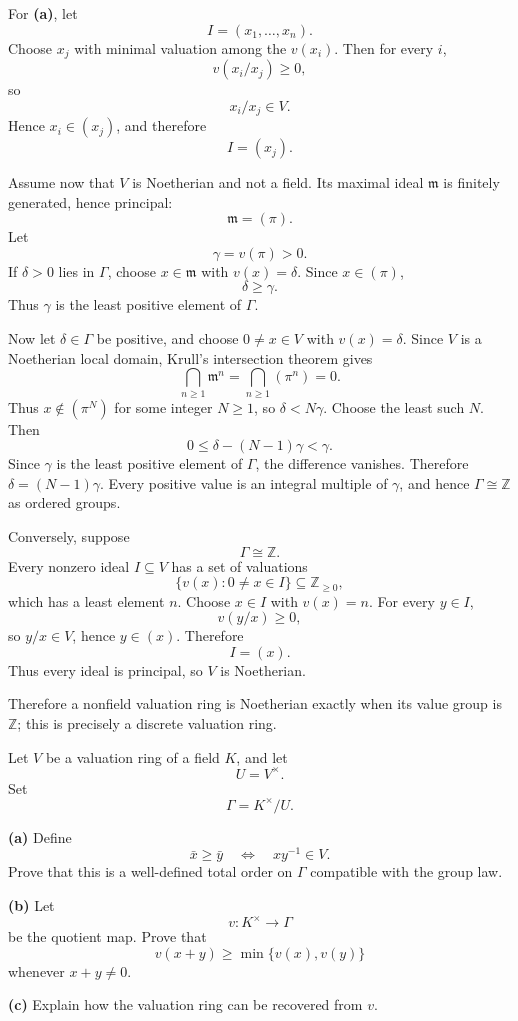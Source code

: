 \begin{solution}
For \textbf{(a)}, let
\[
I=(x_1,\dots,x_n).
\]
Choose \(x_j\) with minimal valuation among the \(v(x_i)\). Then for every
\(i\),
\[
v(x_i/x_j)\ge0,
\]
so
\[
x_i/x_j\in V.
\]
Hence \(x_i\in(x_j)\), and therefore
\[
I=(x_j).
\]

Assume now that \(V\) is Noetherian and not a field. Its maximal ideal
\(\mathfrak m\) is finitely generated, hence principal:
\[
\mathfrak m=(\pi).
\]
Let
\[
\gamma=v(\pi)>0.
\]
If \(\delta>0\) lies in \(\Gamma\), choose \(x\in\mathfrak m\) with
\(v(x)=\delta\). Since \(x\in(\pi)\),
\[
\delta\ge\gamma.
\]
Thus \(\gamma\) is the least positive element of \(\Gamma\).

Now let \(\delta\in\Gamma\) be positive, and choose \(0\ne x\in V\)
with \(v(x)=\delta\). Since \(V\) is a Noetherian local domain,
Krull's intersection theorem gives
\[
\bigcap_{n\ge1}\mathfrak m^n
=\bigcap_{n\ge1}(\pi^n)=0.
\]
Thus \(x\notin(\pi^N)\) for some integer \(N\ge1\), so
\(\delta<N\gamma\). Choose the least such \(N\). Then
\[
0\le\delta-(N-1)\gamma<\gamma.
\]
Since \(\gamma\) is the least positive element of \(\Gamma\), the
difference vanishes. Therefore \(\delta=(N-1)\gamma\).
Every positive value is an integral multiple of \(\gamma\), and hence
\(\Gamma\cong\mathbb Z\) as ordered groups.

Conversely, suppose
\[
\Gamma\cong\mathbb Z.
\]
Every nonzero ideal \(I\subseteq V\) has a set of valuations
\[
\{v(x):0\ne x\in I\}\subseteq\mathbb Z_{\ge0},
\]
which has a least element \(n\). Choose \(x\in I\) with \(v(x)=n\). For every
\(y\in I\),
\[
v(y/x)\ge0,
\]
so \(y/x\in V\), hence \(y\in(x)\). Therefore
\[
I=(x).
\]
Thus every ideal is principal, so \(V\) is Noetherian.

Therefore a nonfield valuation ring is Noetherian exactly when its value
group is \(\mathbb Z\); this is precisely a discrete valuation ring.
\end{solution}


\begin{problem}[CP-V-0038]
\label{prob:cp-v-0038}
Let \(V\) be a valuation ring of a field \(K\), and let
\[
U=V^\times.
\]
Set
\[
\Gamma=K^\times/U.
\]

\textbf{(a)} Define
\[
\bar x\ge \bar y
\quad\Longleftrightarrow\quad
xy^{-1}\in V.
\]
Prove that this is a well-defined total order on \(\Gamma\) compatible with
the group law.

\textbf{(b)} Let
\[
v:K^\times\to\Gamma
\]
be the quotient map. Prove that
\[
v(x+y)\ge \min\{v(x),v(y)\}
\]
whenever \(x+y\ne0\).

\textbf{(c)} Explain how the valuation ring can be recovered from \(v\).
\end{problem}

